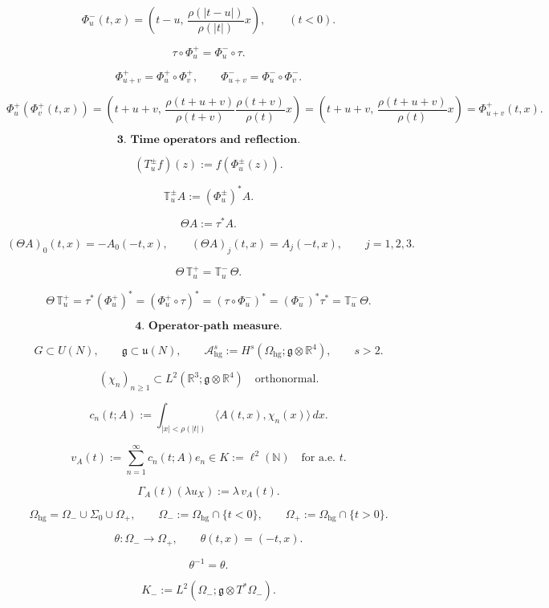 \documentclass[11pt]{article}
\begin{document}
\[
\Phi_u^-(t,x)
=
\left(
t-u,\,
\frac{\rho(|t-u|)}{\rho(|t|)}x
\right),
\qquad
(t<0).
\]

\[
\tau\circ\Phi_u^+=\Phi_u^-\circ\tau.
\]

\[
\Phi_{u+v}^+=\Phi_u^+\circ\Phi_v^+,
\qquad
\Phi_{u+v}^-=\Phi_u^-\circ\Phi_v^-.
\]

\[
\Phi_u^+(\Phi_v^+(t,x))
=
\left(
t+u+v,\,
\frac{\rho(t+u+v)}{\rho(t+v)}
\frac{\rho(t+v)}{\rho(t)}x
\right)
=
\left(
t+u+v,\,
\frac{\rho(t+u+v)}{\rho(t)}x
\right)
=
\Phi_{u+v}^+(t,x).
\]

\bigskip

\[
\textbf{3. Time operators and reflection.}
\]

\[
(T_u^\pm f)(z):=f(\Phi_u^\pm(z)).
\]

\[
\mathbb T_u^\pm A:=(\Phi_u^\pm)^\ast A.
\]

\[
\Theta A:=\tau^\ast A.
\]

\[
(\Theta A)_0(t,x)=-A_0(-t,x),
\qquad
(\Theta A)_j(t,x)=A_j(-t,x),
\qquad
j=1,2,3.
\]

\[
\Theta\,\mathbb T_u^+=\mathbb T_u^-\,\Theta.
\]

\[
\Theta\,\mathbb T_u^+
=
\tau^\ast(\Phi_u^+)^\ast
=
(\Phi_u^+\circ\tau)^\ast
=
(\tau\circ\Phi_u^-)^\ast
=
(\Phi_u^-)^\ast\tau^\ast
=
\mathbb T_u^-\,\Theta.
\]

\bigskip

\[
\textbf{4. Operator-path measure.}
\]

\[
G\subset U(N),
\qquad
\mathfrak g\subset\mathfrak u(N),
\qquad
\mathcal A_{\mathrm{hg}}^s
:=
H^s(\Omega_{\mathrm{hg}};\mathfrak g\otimes\mathbb R^4),
\qquad
s>2.
\]

\[
(\chi_n)_{n\ge1}
\subset
L^2(\mathbb R^3;\mathfrak g\otimes\mathbb R^4)
\quad
\text{orthonormal}.
\]

\[
c_n(t;A)
:=
\int_{|x|<\rho(|t|)}
\langle A(t,x),\chi_n(x)\rangle\,dx.
\]

\[
v_A(t):=\sum_{n=1}^\infty c_n(t;A)e_n
\in
K:=\ell^2(\mathbb N)
\quad
\text{for a.e. }t.
\]

\[
\Gamma_A(t)(\lambda u_X):=\lambda\,v_A(t).
\]

\[
\Omega_{\mathrm{hg}}
=
\Omega_-\cup\Sigma_0\cup\Omega_+,
\qquad
\Omega_-:=\Omega_{\mathrm{hg}}\cap\{t<0\},
\qquad
\Omega_+:=\Omega_{\mathrm{hg}}\cap\{t>0\}.
\]

\[
\theta:\Omega_-\to\Omega_+,
\qquad
\theta(t,x)=(-t,x).
\]

\[
\theta^{-1}=\theta.
\]

\[
K_-:=
L^2(\Omega_-;\mathfrak g\otimes T^\ast\Omega_-).
\]
\end{document}
